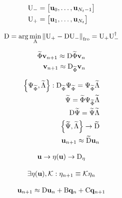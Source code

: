 \begin{align}
    \matr{U}_{-} &=
    \begin{bmatrix}
        \unk_0, \dots, \unk_{N_t-1}
    \end{bmatrix}\\
    \matr{U}_{+} &=
    \begin{bmatrix}
        \unk_1, \dots, \unk_{N_t}
    \end{bmatrix}
\end{align}

\begin{align}
    \matr{D} = \arg \min_{\matr{A}} \norm[\text{fro}]{\matr{U}_{+} - \matr{D} \matr{U}_{-}} = \matr{U}_{+} \matr{U}_{-}^{\dagger}
\end{align}

\begin{align}
    \widetilde{\Phi} \vunk_{n+1} \approx  \matr{D} \widetilde{\Phi} \vunk_{n} \\
    \vunk_{n+1} \approx  \matr{D}_{\widetilde{\Phi}} \vunk_{n} \\
\end{align}

\begin{align}
    \left\{ \Psi_{\widetilde{\Phi}},  \widetilde{\Lambda} \right\} : \matr{D}_{\widetilde{\Phi}}  \Psi_{\widetilde{\Phi}} = \Psi_{\widetilde{\Phi}} \widetilde{\Lambda} \\
    \widetilde{\Psi} = \widetilde{\Phi} \Psi_{\widetilde{\Phi}} \widetilde{\Lambda} \\
    \matr{D} \widetilde{\Psi} = \widetilde{\Psi}\widetilde{\Lambda} \\
    \left\{\widetilde{\Psi},  \widetilde{\Lambda} \right\} \rightarrow \widetilde{\matr{D}}\\
    \unk_{n+1} \approx \widetilde{\matr{D}} \unk_{n}
\end{align}

\begin{align}
   \unk \rightarrow \nlin(\unk) \rightarrow \matr{D}_{\nlin}
\end{align}

\begin{align}
    \exists \nlin(\unk), \matr{\mathcal{K}} : \nlin_{n+1} \equiv \matr{\mathcal{K}}  \nlin_{n}
 \end{align}

\begin{align}
    \unk_{n+1} \approx \matr{D} \unk_{n} + \matr{B} \bvec{q}_{n} + \matr{C} \bvec{q}_{n+1}
\end{align}

